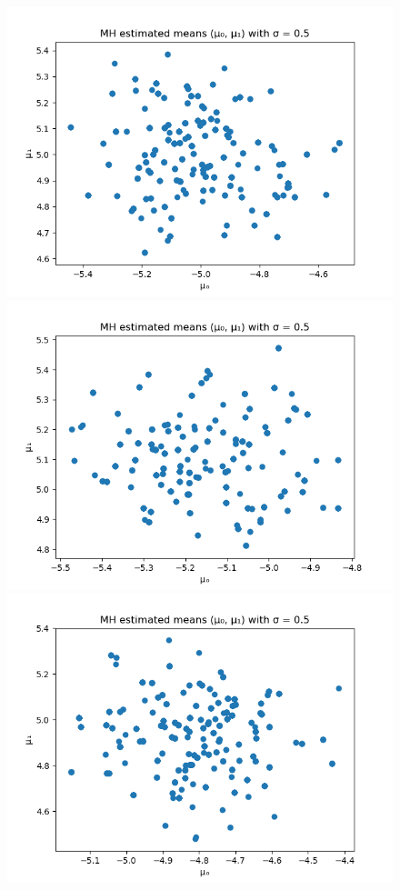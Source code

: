 \begin{figure}
	\centering
	\includegraphics[scale=0.5]{mh-estimated-means-with-sigma-05-1.png}
	\includegraphics[scale=0.5]{mh-estimated-means-with-sigma-05-2.png}
	\includegraphics[scale=0.5]{mh-estimated-means-with-sigma-05-3.png}

\end{figure}
